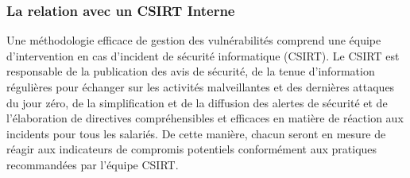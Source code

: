 \subsubsection{La relation avec un CSIRT Interne }

	Une méthodologie efficace de gestion des vulnérabilités comprend une équipe d’intervention en cas d’incident de sécurité informatique (CSIRT). Le CSIRT est responsable de la publication des avis de sécurité, de la tenue d'information régulières pour échanger sur les activités malveillantes et des dernières attaques du jour zéro, de la simplification et de la diffusion des alertes de sécurité et de l’élaboration de directives compréhensibles et efficaces en matière de réaction aux incidents pour tous les salariés. De cette manière, chacun seront en mesure de réagir aux indicateurs de compromis potentiels conformément aux pratiques recommandées par l'équipe CSIRT.